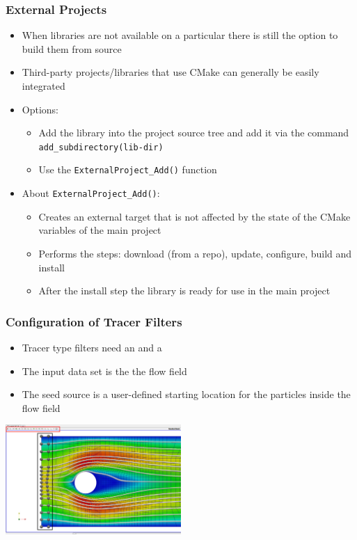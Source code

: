 \begin{frame}

  \frametitle{External Projects}
  \begin{itemize}
    \item When libraries are not available on a particular there is still the option to build them from source
    \item Third-party projects/libraries that use CMake can generally be easily integrated
    \item Options:
    \begin{itemize}
      \item Add the library into the project source tree and add it via the command \texttt{add\_subdirectory(lib-dir)}
      \item Use the \texttt{ExternalProject\_Add()} function
    \end{itemize}
    \item About \texttt{ExternalProject\_Add()}:  
    \begin{itemize}
      \item Creates an external target that is not affected by the state of the CMake variables of the main project
      \item Performs the steps: download (from a repo), update, configure, build and install
      \item After the install step the library is ready for use in the main project
    \end{itemize}
  \end{itemize}

\end{frame}

\begin{frame}

  \frametitle{Configuration of Tracer Filters}

    \begin{itemize}
      \item Tracer type filters need an  and a 
      \item The input data set is the the flow field  
      \item The seed source is a user-defined starting location for the particles inside the flow field  
    \end{itemize}
    \includegraphics[width=0.5\textwidth]{screenshots/tracer-source.png}

\end{frame}

